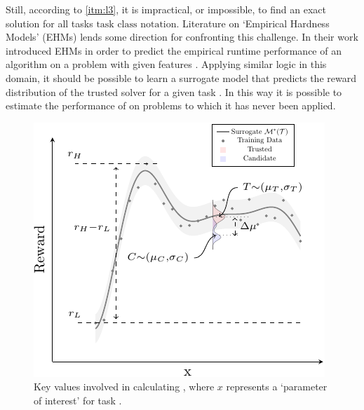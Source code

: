         Still, according to \ref{itm:l3}, it is impractical, or impossible, to find an exact solution for all tasks $\text{task class notation}$. Literature on `Empirical Hardness Models' (EHMs) lends some direction for confronting this challenge. In their work \cite{Leyton-Brown2009-yr,Hutter2009-og} introduced EHMs in order to predict the empirical runtime performance of an algorithm on a problem with given features . Applying similar logic in this domain, it should be possible to learn a surrogate model \surrogate{} that predicts the reward distribution \rwdstarapprox{} of the trusted solver \solvestar{} for a given task \task. In this way it is possible to estimate the performance of \solvestar{} on problems to which it has never been applied.
        
   \begin{figure}[tb]
        \centering
        \includegraphics[width=0.8\linewidth]{Figures/sq_v2_fig-crop}
        \caption{Key values involved in calculating \xQ, where $x$ represents a `parameter of interest' for task \task. }
        \label{fig:sq_v2}
    \end{figure}